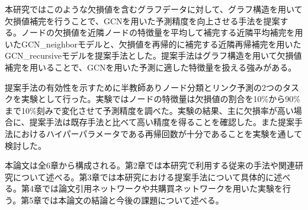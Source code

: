 本研究ではこのような欠損値を含むグラフデータに対して、グラフ構造を用いて欠損値補完を行うことで、GCNを用いた予測精度を向上させる手法を提案する。ノードの欠損値を近隣ノードの特徴量を平均して補完する近隣平均補完を用いたGCN\_neighborモデルと、欠損値を再帰的に補完する近隣再帰補完を用いたGCN\_recursiveモデルを提案手法とした。提案手法はグラフ構造を用いて欠損値補完を用いることで、GCNを用いた予測に適した特徴量を扱える強みがある。
  
提案手法の有効性を示すために半教師ありノード分類とリンク予測の2つのタスクを実験として行った。実験ではノードの特徴量は欠損値の割合を10\%から90\%まで10\%刻みで変化させて予測精度を調べた。実験の結果、主に欠損率が高い場合に、提案手法は既存手法と比べて高い精度を得ることを確認した。また提案手法におけるハイパーパラメータである再帰回数が十分であることを実験を通して検討した。

本論文は全6章から構成される。第2章では本研究で利用する従来の手法や関連研究について述べる。第3章では本研究における提案手法について具体的に述べる。第4章では論文引用ネットワークや共購買ネットワークを用いた実験を行う。第5章では本論文の結論と今後の課題について述べる。
